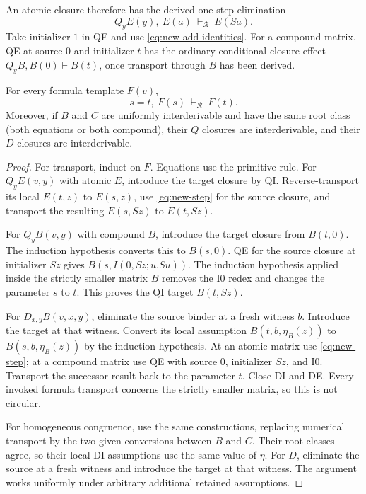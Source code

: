 An atomic closure therefore has the derived one-step elimination
\begin{equation}
 Q_yE(y),\ E(a)\ \vdash_{\mathcal R}\ E(Sa).
 \label{eq:new-step}
\end{equation}
Take initializer $1$ in QE and use \eqref{eq:new-add-identities}.
For a compound matrix, QE at source $0$ and initializer $t$ has the ordinary
conditional-closure effect $Q_yB,B(0)\vdash B(t)$, once transport through
$B$ has been derived.

\begin{lemma}
\label{lem:new-transport}
For every formula template $F(v)$,
\begin{equation}
 s=t,\ F(s)\ \vdash_{\mathcal R}\ F(t).
 \label{eq:new-full-tr}
\end{equation}
Moreover, if $B$ and $C$ are uniformly interderivable and have the same root
class (both equations or both compound), their $Q$ closures are
interderivable, and their $D$ closures are interderivable.
\end{lemma}
\begin{proof}
For transport, induct on $F$.  Equations use the primitive rule.  For
$Q_yE(v,y)$ with atomic $E$, introduce the target closure by QI.
Reverse-transport its local $E(t,z)$ to $E(s,z)$, use
\eqref{eq:new-step} for the source closure, and transport the resulting
$E(s,Sz)$ to $E(t,Sz)$.

For $Q_yB(v,y)$ with compound $B$, introduce the target closure from
$B(t,0)$.  The induction hypothesis converts this to $B(s,0)$.
QE for the source closure at initializer $Sz$ gives
$B(s,I(0,Sz;u.Su))$.  The induction hypothesis applied inside the strictly
smaller matrix $B$ removes the I0 redex and changes the parameter $s$ to $t$.
This proves the QI target $B(t,Sz)$.

For $D_{x,y}B(v,x,y)$, eliminate the source binder at a fresh witness $b$.
Introduce the target at that witness.  Convert its local assumption
$B(t,b,\eta_B(z))$ to $B(s,b,\eta_B(z))$ by the induction hypothesis.
At an atomic matrix use \eqref{eq:new-step}; at a compound matrix use QE
with source $0$, initializer $Sz$, and I0.  Transport the successor result
back to the parameter $t$.  Close DI and DE.  Every invoked formula
transport concerns the strictly smaller matrix, so this is not circular.

For homogeneous congruence, use the same constructions, replacing numerical
transport by the two given conversions between $B$ and $C$.  Their root
classes agree, so their local DI assumptions use the same value of $\eta$.
For $D$, eliminate the source at a fresh witness and introduce the target
at that witness.  The argument works uniformly under arbitrary additional
retained assumptions.
\end{proof}

